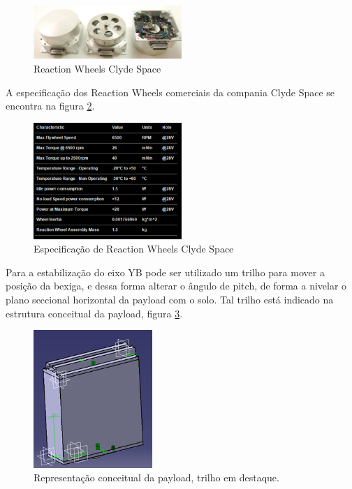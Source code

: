 	\begin{figure}[H]
		\centering
		\includegraphics[width=0.5\textwidth]{figuras/reaction}
		\caption{Reaction Wheels Clyde Space}
		\label{img:reaction}
	\end{figure}

	A especificação dos Reaction Wheels comerciais da compania Clyde Space se encontra na figura \ref{img:especificacao}.

	\begin{figure}[H]
		\centering
		\includegraphics[width=0.5\textwidth]{figuras/especificacao}
		\caption{Especificação de Reaction Wheels Clyde Space~\cite{clyde}}
		\label{img:especificacao}
	\end{figure}

	Para a estabilização do eixo YB pode ser utilizado um trilho para mover a posição da bexiga, e dessa forma alterar o ângulo de pitch, de forma a nivelar o plano seccional horizontal da payload com o solo. Tal trilho está indicado na estrutura conceitual da payload, figura \ref{img:trilho}.

	\begin{figure}[H]
		\centering
		\includegraphics[width=0.4\textwidth]{figuras/trilho}
		\caption{Representação conceitual da payload, trilho em destaque.}
		\label{img:trilho}
	\end{figure}

